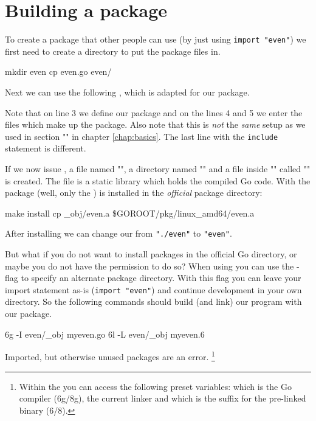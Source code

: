 \section{Building a package}
\label{sec:building a package}
To create a package that other people can use (by just using
\lstinline{import "even"}) we first need to create a directory
to put the package files in. 
\begin{display}
\pr mkdir even
\pr cp even.go even/
\end{display}
\noindent{}Next we 
can use the following 
, which 
is adapted for our  package.

Note that on line 3 we define our  package and on the
lines 4 and 5 we enter the files which make up the package.
Also note that this is \emph{not} the \emph{same}  setup as we used
in section "" in chapter
\ref{chap:basics}. The last line with the \verb|include| statement is
different.

If we now issue , a file named "", a directory
named "" and a file inside "" called
""
is created. The file  is a static library which holds
the compiled Go code.
With  the package (well, only the ) is installed in the \emph{official}
package directory:
\begin{display}
\pr make install
cp \_obj/even.a \$GOROOT/pkg/linux\_amd64/even.a
\end{display}
\noindent{}After installing we can change our  from
\lstinline{"./even"} to \lstinline{"even"}.

But what if you do not want to install packages in the official Go
directory, or maybe you do not have the permission to do so? When using
 you can use the -flag to specify an alternate
package directory. With this flag you can leave your import statement
as-is (\lstinline{import "even"}) and continue development in your
own directory. So the following commands should build (and link) our
 program with our package.
\begin{display}
\pr 6g -I even/\_obj myeven.go	
\pr 6l -L even/\_obj myeven.6	
\end{display}

\noindent{}Imported, but otherwise unused packages are an error.
\footnote{Within the  you can access the following
preset variables:  which is the Go compiler (6g/8g),
 the current linker and  which is the suffix
for the pre-linked binary (6/8).}

